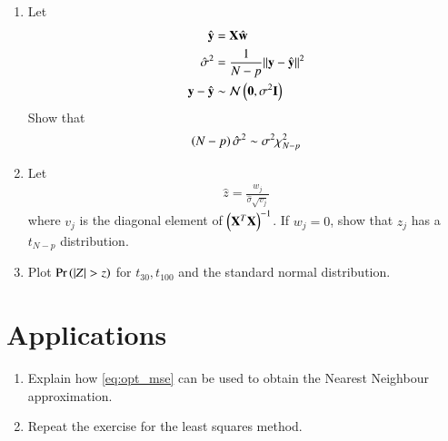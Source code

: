 \documentclass[journal,12pt,twocolumn]{IEEEtran}
\renewcommand\thesection{\arabic{section}}
\begin{document}
\begin{enumerate}[label=\thesection.\arabic*
,ref=\thesection.\theenumi]
\begin{align}
\vec{C}_{\vec{y}} = \sigma^2\vec{I}
\end{align}
show that
\begin{align}
\vec{C}_{\vec{w}} = \sigma^2\brak{\vec{X}^T\vec{X}}^{-1}
\end{align}
%
\item Let
%
\begin{align}
\hat{\mathbf{y}} &= \mathbf{X}\hat{\mathbf{w}}
\\
\hat{\sigma}^2 &= \frac{1}{N-p}\lVert\mathbf{y}-\hat{\mathbf{y}}\rVert^2
\\
\mathbf{y}-\hat{\mathbf{y}} &\sim \mathcal{N}\left(\mathbf{0}, \sigma^2\mathbf{I}\right)
\end{align}
%
Show that
\begin{align}
\left(N-p\right)\hat{\sigma}^2 \sim \sigma^2\chi_{N-p}^2
\end{align}
\item Let 
\begin{align}
\hat{z}=\frac{w_j}{\hat{\sigma}\sqrt{v_j}}
\end{align}
%
where $v_j$ is the diagonal element of $\left(\mathbf{X}^T\mathbf{X}\right)^{-1}$.  
If $w_j= 0$,  show 
that $z_j$ has a $t_{N-p}$ distribution.
\item Plot $\Pr\left(\left\vert Z\right\vert>z\right)$ for $t_{30}, t_{100}$ and the standard normal 
distribution.
\end{enumerate}
\section{Applications}
\begin{enumerate}[label=\thesection.\arabic*
,ref=\thesection.\theenumi]
\item Explain how \eqref{eq:opt_mse} can be used to obtain the  Nearest 
Neighbour approximation.
\item Repeat the exercise for the least squares method.
\end{enumerate}
%
\end{document}
